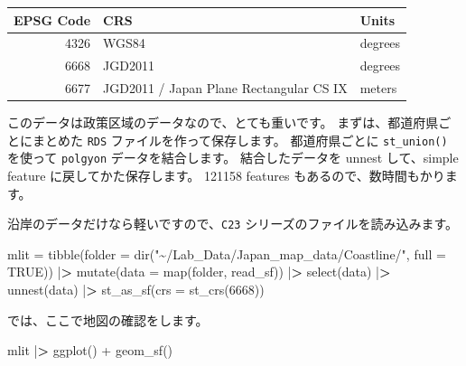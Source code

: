 \documentclass[
]{book}
\newenvironment{Shaded}{\begin{snugshade}}{\end{snugshade}}
\newcommand{\AttributeTok}[1]{\textcolor[rgb]{0.77,0.63,0.00}{#1}}
\newcommand{\ConstantTok}[1]{\textcolor[rgb]{0.00,0.00,0.00}{#1}}
\newcommand{\DecValTok}[1]{\textcolor[rgb]{0.00,0.00,0.81}{#1}}
\newcommand{\ErrorTok}[1]{\textcolor[rgb]{0.64,0.00,0.00}{\textbf{#1}}}
\newcommand{\FunctionTok}[1]{\textcolor[rgb]{0.00,0.00,0.00}{#1}}
\newcommand{\NormalTok}[1]{#1}
\newcommand{\OtherTok}[1]{\textcolor[rgb]{0.56,0.35,0.01}{#1}}
\newcommand{\SpecialCharTok}[1]{\textcolor[rgb]{0.00,0.00,0.00}{#1}}
\newcommand{\StringTok}[1]{\textcolor[rgb]{0.31,0.60,0.02}{#1}}
\theoremstyle{definition}
\theoremstyle{definition}
\theoremstyle{definition}
\theoremstyle{definition}
\theoremstyle{remark}
\begin{document}
\begin{table}
\centering
\begin{tabular}[t]{r|l|l}
\hline
EPSG Code & CRS & Units\\
\hline
4326 & WGS84 & degrees\\
\hline
6668 & JGD2011 & degrees\\
\hline
6677 & JGD2011 / Japan Plane Rectangular CS IX & meters\\
\hline
\end{tabular}
\end{table}

このデータは政策区域のデータなので、とても重いです。
まずは、都道府県ごとにまとめた \texttt{RDS} ファイルを作って保存します。
都道府県ごとに \texttt{st\_union()} を使って \texttt{polgyon} データを結合します。
結合したデータを unnest して、simple feature に戻してかた保存します。
121158 features もあるので、数時間もかります。

沿岸のデータだけなら軽いですので、\texttt{C23} シリーズのファイルを読み込みます。

\begin{Shaded}
\begin{Highlighting}[]
\NormalTok{mlit }\OtherTok{=} \FunctionTok{tibble}\NormalTok{(}\AttributeTok{folder =} \FunctionTok{dir}\NormalTok{(}\StringTok{"\textasciitilde{}/Lab\_Data/Japan\_map\_data/Coastline/"}\NormalTok{, }\AttributeTok{full =} \ConstantTok{TRUE}\NormalTok{)) }\SpecialCharTok{|}\ErrorTok{\textgreater{}} 
  \FunctionTok{mutate}\NormalTok{(}\AttributeTok{data =} \FunctionTok{map}\NormalTok{(folder, read\_sf)) }\SpecialCharTok{|}\ErrorTok{\textgreater{}} \FunctionTok{select}\NormalTok{(data) }\SpecialCharTok{|}\ErrorTok{\textgreater{}} 
  \FunctionTok{unnest}\NormalTok{(data) }\SpecialCharTok{|}\ErrorTok{\textgreater{}} 
  \FunctionTok{st\_as\_sf}\NormalTok{(}\AttributeTok{crs =} \FunctionTok{st\_crs}\NormalTok{(}\DecValTok{6668}\NormalTok{))}
\end{Highlighting}
\end{Shaded}

では、ここで地図の確認をします。

\begin{Shaded}
\begin{Highlighting}[]
\NormalTok{mlit }\SpecialCharTok{|}\ErrorTok{\textgreater{}} \FunctionTok{ggplot}\NormalTok{() }\SpecialCharTok{+} \FunctionTok{geom\_sf}\NormalTok{()}
\end{Highlighting}
\end{Shaded}
\end{document}
